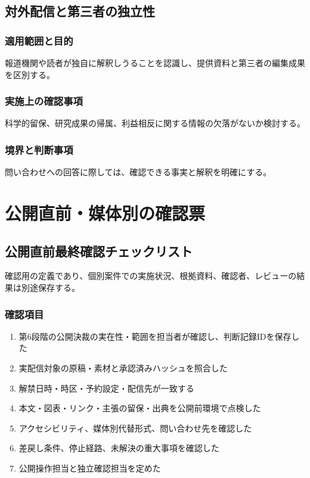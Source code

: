 \documentclass[a4paper,11pt]{article}
\begin{document}
\subsection{対外配信と第三者の独立性}
\subsubsection{適用範囲と目的}
\par 報道機関や読者が独自に解釈しうることを認識し、提供資料と第三者の編集成果を区別する。\par\medskip
\subsubsection{実施上の確認事項}
\par 科学的留保、研究成果の帰属、利益相反に関する情報の欠落がないか検討する。\par\medskip
\subsubsection{境界と判断事項}
\par 問い合わせへの回答に際しては、確認できる事実と解釈を明確にする。\par\medskip
\section{公開直前・媒体別の確認票}
\subsection{公開直前最終確認チェックリスト}
\par 確認用の定義であり、個別案件での実施状況、根拠資料、確認者、レビューの結果は別途保存する。\par\medskip
\subsubsection*{確認項目}
\begin{enumerate}[leftmargin=2em,itemsep=0.3em]
\item 第6段階の公開決裁の実在性・範囲を担当者が確認し、判断記録IDを保存した\par
\item 実配信対象の原稿・素材と承認済みハッシュを照合した\par
\item 解禁日時・時区・予約設定・配信先が一致する\par
\item 本文・図表・リンク・主張の留保・出典を公開前環境で点検した\par
\item アクセシビリティ、媒体別代替形式、問い合わせ先を確認した\par
\item 差戻し条件、停止経路、未解決の重大事項を確認した\par
\item 公開操作担当と独立確認担当を定めた\par
\end{enumerate}
\end{document}
